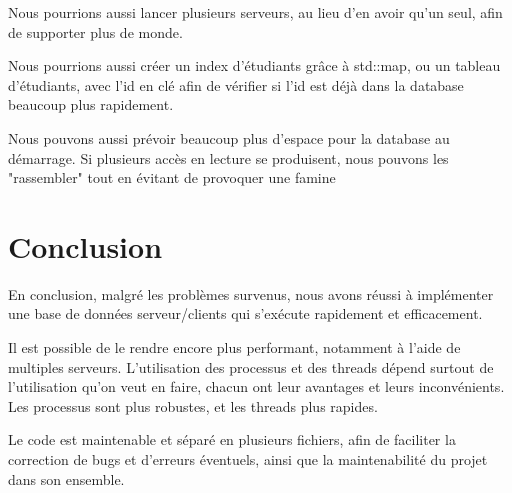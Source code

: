 \documentclass[utf8]{article}
\begin{document}
\begin{large}
Nous pourrions aussi lancer plusieurs serveurs, au lieu d'en avoir qu'un seul,
afin de supporter plus de monde.

Nous pourrions aussi créer un index d'étudiants grâce à std::map, ou un tableau
d'étudiants, avec l'id en clé afin de vérifier si l'id est déjà dans la database
beaucoup plus rapidement.

Nous pouvons aussi prévoir beaucoup plus d'espace pour la database au démarrage.
Si plusieurs accès en lecture se produisent, nous pouvons les "rassembler" tout
en évitant de provoquer une famine
\section{Conclusion}
\par
\indent
En conclusion, malgré les problèmes survenus, nous avons réussi à implémenter
une base de données serveur/clients qui s'exécute rapidement et
efficacement.
\par 
Il est possible de le rendre encore plus performant, notamment
à l'aide de multiples serveurs. L'utilisation des processus et des threads
dépend surtout de l'utilisation qu'on veut en faire, chacun ont leur avantages
et leurs inconvénients. Les processus sont plus robustes, et les threads plus rapides.

Le code est maintenable et séparé en plusieurs fichiers,
afin de faciliter la correction de bugs et d'erreurs éventuels, ainsi que la
maintenabilité du projet dans son ensemble.
\par

\end{large}
\end{document}
